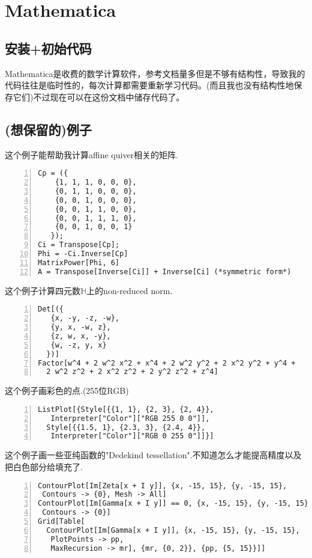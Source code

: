 \documentclass[11pt]{amsart}
\begin{document}
\section{Mathematica}
\subsection{安装+初始代码}
Mathematica是收费的数学计算软件，参考文档量多但是不够有结构性，导致我的代码往往是临时性的，每次计算都需要重新学习代码。(而且我也没有结构性地保存它们)不过现在可以在这份文档中储存代码了。

\subsection{(想保留的)例子}

这个例子能帮助我计算affine quiver相关的矩阵.
\begin{lstlisting}[numbers=left,numberstyle=\tiny,numbersep=10pt]
Cp = ({
    {1, 1, 1, 0, 0, 0},
    {0, 1, 1, 0, 0, 0},
    {0, 0, 1, 0, 0, 0},
    {0, 0, 1, 1, 0, 0},
    {0, 0, 1, 1, 1, 0},
    {0, 0, 1, 0, 0, 1}
   });
Ci = Transpose[Cp];
Phi = -Ci.Inverse[Cp]
MatrixPower[Phi, 6]
A = Transpose[Inverse[Ci]] + Inverse[Ci] (*symmetric form*)
\end{lstlisting}
这个例子计算四元数$\mathbb{H}$上的non-reduced norm.
\begin{lstlisting}[numbers=left,numberstyle=\tiny,numbersep=10pt]
Det[({
   {x, -y, -z, -w},
   {y, x, -w, z},
   {z, w, x, -y},
   {w, -z, y, x}
  })]
Factor[w^4 + 2 w^2 x^2 + x^4 + 2 w^2 y^2 + 2 x^2 y^2 + y^4 + 
  2 w^2 z^2 + 2 x^2 z^2 + 2 y^2 z^2 + z^4]
\end{lstlisting}
这个例子画彩色的点.(255位RGB)
\begin{lstlisting}[numbers=left,numberstyle=\tiny,numbersep=10pt]
ListPlot[{Style[{{1, 1}, {2, 3}, {2, 4}}, 
   Interpreter["Color"]["RGB 255 0 0"]], 
  Style[{{1.5, 1}, {2.3, 3}, {2.4, 4}}, 
   Interpreter["Color"]["RGB 0 255 0"]]}]
\end{lstlisting}
这个例子画一些亚纯函数的"Dedekind tessellation".不知道怎么才能提高精度以及把白色部分给填充了.
\begin{lstlisting}[numbers=left,numberstyle=\tiny,numbersep=10pt]
ContourPlot[Im[Zeta[x + I y]], {x, -15, 15}, {y, -15, 15}, 
 Contours -> {0}, Mesh -> All]
ContourPlot[Im[Gamma[x + I y]] == 0, {x, -15, 15}, {y, -15, 15}, 
 Contours -> {0}]
Grid[Table[
  ContourPlot[Im[Gamma[x + I y]], {x, -15, 15}, {y, -15, 15}, 
   PlotPoints -> pp, 
   MaxRecursion -> mr], {mr, {0, 2}}, {pp, {5, 15}}]]
\end{lstlisting}
\end{document}
